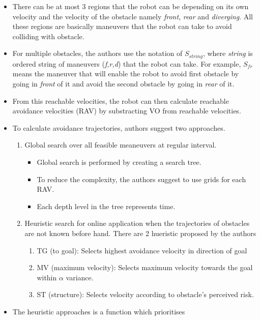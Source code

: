 \documentclass[12pt]{article}
\begin{document}
\begin{itemize}
    \item There can be at most 3 regions that the robot can be depending on its own velocity and the velocity of the obstacle namely \textit{front}, \textit{rear} and \textit{diverging}. All these regions are basically maneuvers that the robot can take to avoid colliding with obstacle.
    \item For multiple obstacles, the authors use the notation of $S_{string}$, where \textit{string} is ordered string of maneuvers (\textit{f,r,d}) that the robot can take. For example, $S_{fr}$ means the maneuver that will enable the robot to avoid first obstacle by going in \textit{front} of it and avoid the second obstacle by going in \textit{rear} of it.
    \item From this reachable velocities, the robot can then calculate reachable avoidance velocities (RAV) by substracting VO from reachable velocities.
    \item To calculate avoidance trajectories, authors suggest two approaches. 
        \begin{enumerate}
            \item Global search over all feasible meaneuvers at regular interval.
                \begin{itemize}
                    \item Global search is performed by creating a search tree.
                    \item To reduce the complexity, the authors suggest to use grids for each RAV\@.
                    \item Each depth level in the tree represents time.
                \end{itemize}
            \item Heuristic search for online application when the trajectories of obstacles are not known before hand. There are 2 hueristic proposed by the authors
                \begin{enumerate}
                    \item TG (to goal): Selects highest avoidance velocity in direction of goal
                    \item MV (maximum velocity): Selects maximum velocity towards the goal within $\alpha$ variance. 
                    \item ST (structure): Selects velocity according to obstacle's perceived risk.
                \end{enumerate}
        \end{enumerate}
    \item The heuristic approaches is a function which prioritises

\end{itemize}
\end{document}
